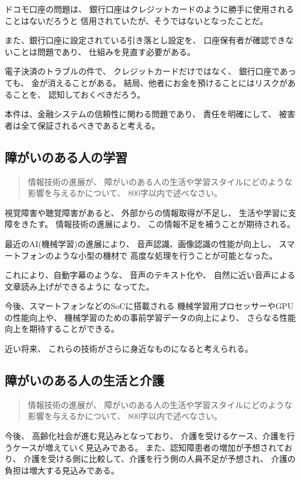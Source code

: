 \documentclass[12pt]{jsarticle}
\begin{document}
ドコモ口座の問題は、
銀行口座はクレジットカードのように勝手に使用されることはないだろうと
信用されていたが、そうではないとなったことだ。

また、銀行口座に設定されている引き落とし設定を、
口座保有者が確認できないことは問題であり、
仕組みを見直す必要がある。

電子決済のトラブルの件で、
クレジットカードだけではなく、
銀行口座であっても、
金が消えることがある。
結局、他者にお金を預けることにはリスクがあることを、
認知しておくべきだろう。

本件は、金融システムの信頼性に関わる問題であり、
責任を明確にして、
被害者は全て保証されるべきであると考える。

\subsection{
障がいのある人の学習
}

\begin{quotation}
情報技術の進展が、
障がいのある人の生活や学習スタイルにどのような影響を与えるかについて、
800字以内で述べなさい。
\end{quotation}

視覚障害や聴覚障害があると、
外部からの情報取得が不足し、
生活や学習に支障をきたす。
情報技術の進展により、
この情報不足を補うことが期待される。

最近のAI(機械学習)の進展により、
音声認識、画像認識の性能が向上し、
スマートフォンのような小型の機材で
高度な処理を行うことが可能となった。

これにより、自動字幕のような、
音声のテキスト化や、
自然に近い音声による文章読み上げができるように
なってた。

今後、スマートフォンなどのSoCに搭載される
機械学習用プロセッサーやGPUの性能向上や、
機械学習のための事前学習データの向上により、
さらなる性能向上を期待することができる。

近い将来、
これらの技術がさらに身近なものになると考えられる。

\subsection{
障がいのある人の生活と介護
}

\begin{quotation}
情報技術の進展が、
障がいのある人の生活や学習スタイルにどのような影響を与えるかについて、
800字以内で述べなさい。
\end{quotation}

今後、
高齢化社会が進む見込みとなっており、
介護を受けるケース、介護を行うケースが増えていく見込みである。
また、認知障患者の増加が予想されており、
介護を受ける側に比較して、介護を行う側の人員不足が予想され、
介護の負担は増大する見込みである。
\end{document}
